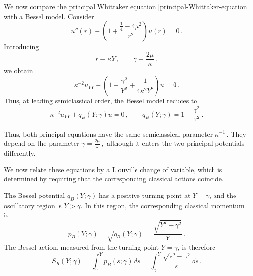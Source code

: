\documentclass[11pt]{amsart}
\numberwithin{equation}{section}
\theoremstyle{remark}
\newcommand{\mn}{\medskip\noindent}
\begin{document}
\vspace{0.5cm}\noindent
We now compare the principal Whittaker equation
\eqref{principal-Whittaker-equation} with a Bessel model.
Consider
\begin{equation}\label{Bessel-model-equation}
u''(r)
+
\left(
1+\frac{\frac14-4\mu^2}{r^2}
\right)u(r)
=
0\,.
\end{equation}
Introducing
\begin{equation}\label{Bessel-scaling}
r=\kappa Y\,,
\qquad
\gamma=\frac{2\mu}{\kappa}\,,
\end{equation}
we obtain
\begin{equation}\label{scaled-Bessel-equation}
\kappa^{-2}u_{YY}
+
\left(
1-\frac{\gamma^2}{Y^2}
+\frac{1}{4\kappa^2Y^2}
\right)u
=
0\,.
\end{equation}
Thus, at leading semiclassical order, the Bessel model reduces to
\begin{equation}\label{principal-Bessel-equation}
\kappa^{-2}u_{YY}
+
q_B(Y;\gamma)u
=
0\,,
\qquad
q_B(Y;\gamma)
=
1-\frac{\gamma^2}{Y^2}\,.
\end{equation}

\mn
Thus, both principal equations have the same semiclassical parameter
$\kappa^{-1}\,$. They depend on the parameter
$
\gamma=\frac{2\mu}{\kappa}\,,
$
although it enters the two principal potentials differently.

\mn 
We now relate these equations by a Liouville change of variable, which is
determined by requiring that the corresponding classical actions
coincide.

\mn
The Bessel potential $q_B(Y;\gamma)$ has a positive turning point at
$Y=\gamma$, and the oscillatory region is $Y>\gamma$. In this region,
the corresponding classical momentum is
\begin{equation}\label{Bessel-momentum}
p_B(Y;\gamma)
=
\sqrt{q_B(Y;\gamma)}
=
\frac{\sqrt{Y^2-\gamma^2}}{Y}\,.
\end{equation}
The Bessel action, measured from the turning point $Y=\gamma$, is
therefore
\begin{equation}\label{Bessel-action-Y}
S_B(Y;\gamma)
=
\int_{\gamma}^{Y}p_B(s;\gamma)\,ds
=
\int_{\gamma}^{Y}
\frac{\sqrt{s^2-\gamma^2}}{s}\,ds\,.
\end{equation}
\end{document}
